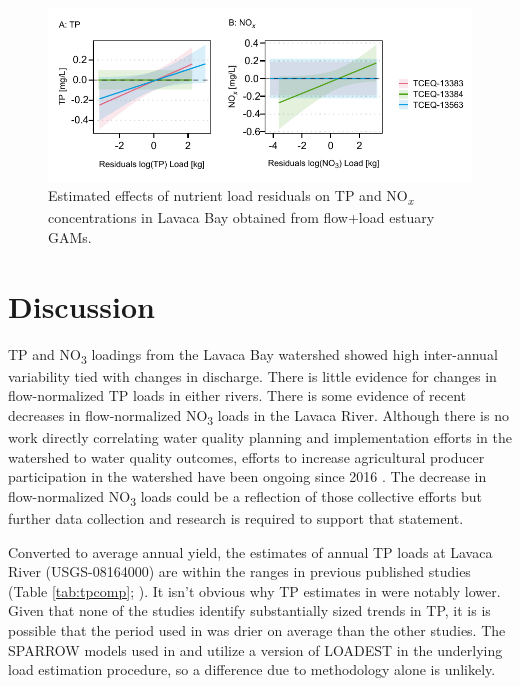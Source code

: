 \documentclass[water,article,submit,oneauthor]{Definitions/mdpi}
\begin{document}
\begin{figure}

{\centering \includegraphics[width=1\linewidth]{Schramm-Manuscript-2023_files/figure-latex/fig7-1} 

}

\caption[Estimated effects of nutrient load residuals on TP and NO\textsubscript{\emph{x}} concentrations in Lavaca Bay obtained from flow+load estuary GAMs]{Estimated effects of nutrient load residuals on TP and NO\textsubscript{\emph{x}} concentrations in Lavaca Bay obtained from flow+load estuary GAMs.}\label{fig:fig7}
\end{figure}

\hypertarget{discussion}{%
\section{Discussion}\label{discussion}}

TP and NO\textsubscript{3} loadings from the Lavaca Bay watershed showed
high inter-annual variability tied with changes in discharge. There is
little evidence for changes in flow-normalized TP loads in either
rivers. There is some evidence of recent decreases in flow-normalized
NO\textsubscript{3} loads in the Lavaca River. Although there is no work
directly correlating water quality planning and implementation efforts
in the watershed to water quality outcomes, efforts to increase
agricultural producer participation in the watershed have been ongoing
since 2016
\citep{schramm_lavaca_2018, bertholdDirectMailingEducation2021}. The
decrease in flow-normalized NO\textsubscript{3} loads could be a
reflection of those collective efforts but further data collection and
research is required to support that statement.

Converted to average annual yield, the estimates of annual TP loads at
Lavaca River (USGS-08164000) are within the ranges in previous published
studies (Table \ref{tab:tpcomp};
\citep{dunnTrendsNutrientInflows1996, rebich_sources_2011, omaniEstimationSedimentNutrient2014, wise_spatially_2019}).
It isn't obvious why TP estimates in
\citet{dunnTrendsNutrientInflows1996} were notably lower. Given that
none of the studies identify substantially sized trends in TP, it is is
possible that the period used in \citet{dunnTrendsNutrientInflows1996}
was drier on average than the other studies. The SPARROW models used in
\citet{rebich_sources_2011} and \citet{wise_spatially_2019} utilize a
version of LOADEST in the underlying load estimation procedure, so a
difference due to methodology alone is unlikely.
\end{document}
